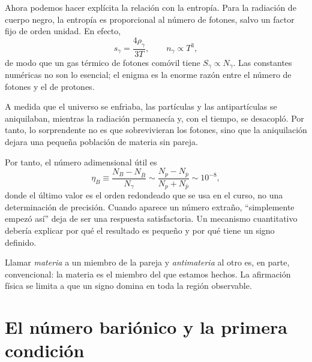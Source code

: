 Ahora podemos hacer explícita la relación con la entropía. Para la radiación de cuerpo negro, la entropía es proporcional al número de fotones, salvo un factor fijo de orden unidad. En efecto,
\begin{equation}
s_\gamma=\frac{4\rho_\gamma}{3T},
\qquad
n_\gamma\propto T^3,
\end{equation}
de modo que un gas térmico de fotones comóvil tiene \(S_\gamma\propto N_\gamma\). Las constantes numéricas no son lo esencial; el enigma es la enorme razón entre el número de fotones y el de protones.

\begin{classroomqa}
\end{classroomqa}

A medida que el universo se enfriaba, las partículas y las antipartículas se aniquilaban, mientras la radiación permanecía y, con el tiempo, se desacopló. Por tanto, lo sorprendente no es que sobrevivieran los fotones, sino que la aniquilación dejara una pequeña población de materia sin pareja.

Por tanto, el número adimensional útil es
\begin{equation}
\eta_B
\equiv
\frac{N_B-N_{\bar B}}{N_\gamma}
\sim
\frac{N_p-N_{\bar p}}{N_p+N_{\bar p}}
\sim 10^{-8},
\label{eq:c08-baryon-asymmetry}
\end{equation}
donde el último valor es el orden redondeado que se usa en el curso, no una determinación de precisión. Cuando aparece un número extraño, ``simplemente empezó así'' deja de ser una respuesta satisfactoria. Un mecanismo cuantitativo debería explicar por qué el resultado es pequeño y por qué tiene un signo definido.

Llamar \emph{materia} a un miembro de la pareja y \emph{antimateria} al otro es, en parte, convencional: la materia es el miembro del que estamos hechos. La afirmación física se limita a que un signo domina en toda la región observable.

\section{El número bariónico y la primera condición}

